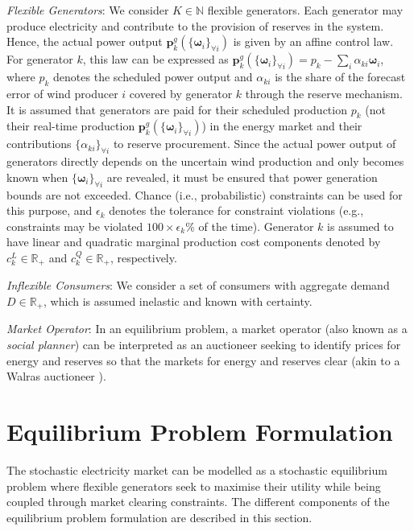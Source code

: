 \documentclass{article}
\begin{document}
\textit{Flexible Generators}: We consider $K \in \mathbb{N}$ flexible generators. Each generator may produce electricity and contribute to the provision of reserves in the system. Hence, the actual power output $\mathbf{p}_k^g(\{\boldsymbol{\omega}_i\}_{\forall i})$ is given by an affine control law. For generator $k$, this law can be expressed as $\mathbf{p}_k^g(\{\boldsymbol{\omega}_i\}_{\forall i}) = p_k - \sum_{i }\alpha_{ki} \boldsymbol{\omega}_i$, where $p_k$ denotes the scheduled power output and $\alpha_{ki}$ is the share of the forecast error of wind producer $i$ covered by generator $k$ through the reserve mechanism. It is assumed that generators are paid for their scheduled production $p_k$ (not their real-time production $\mathbf{p}_k^g(\{\boldsymbol{\omega}_i\}_{\forall i})$) in the energy market and their contributions $\{\alpha_{ki}\}_{\forall i}$ to reserve procurement. Since the actual power output of generators directly depends on the uncertain wind production and only becomes known when $\{\boldsymbol{\omega}_i\}_{\forall i}$ are revealed, it must be ensured that power generation bounds are not exceeded. Chance (i.e., probabilistic) constraints can be used for this purpose, and $\epsilon_k$ denotes the tolerance for constraint violations (e.g., constraints may be violated $100 \times \epsilon_k \%$ of the time). Generator $k$ is assumed to have linear and quadratic marginal production cost components denoted by $c_k^L \in \mathbb{R}_+$ and $c_k^Q \in \mathbb{R}_+$, respectively.

\textit{Inflexible Consumers}: We consider a set of consumers with aggregate demand $D \in \mathbb{R}_+$, which is assumed inelastic and known with certainty.

\textit{Market Operator}: In an equilibrium problem, a market operator (also known as a \textit{social planner}) can be interpreted as an auctioneer seeking to identify prices for energy and reserves so that the markets for energy and reserves clear (akin to a Walras auctioneer \cite{Uzawa1960}). 

\section{Equilibrium Problem Formulation}

The stochastic electricity market can be modelled as a stochastic equilibrium problem where flexible generators seek to maximise their utility while being coupled through market clearing constraints. The different components of the equilibrium problem formulation are described in this section. 
\end{document}
